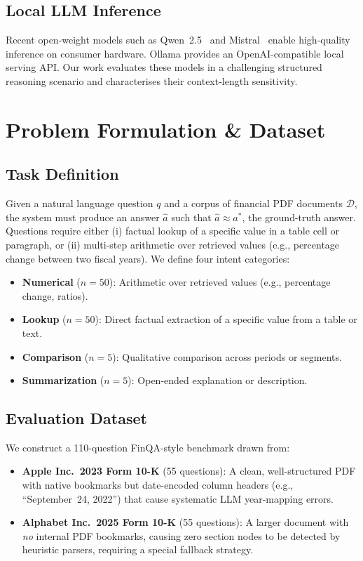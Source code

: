 \documentclass[conference]{IEEEtran}
\begin{document}
\subsection{Local LLM Inference}
Recent open-weight models such as Qwen~2.5~\cite{qwen2025} and
Mistral~\cite{jiang2023mistral} enable high-quality inference on consumer hardware.
Ollama provides an OpenAI-compatible local serving API. Our work evaluates these
models in a challenging structured reasoning scenario and characterises their
context-length sensitivity.

\section{Problem Formulation \& Dataset}

\subsection{Task Definition}
Given a natural language question $q$ and a corpus of financial PDF documents
$\mathcal{D}$, the system must produce an answer $\hat{a}$ such that
$\hat{a} \approx a^*$, the ground-truth answer. Questions require either
(i) factual lookup of a specific value in a table cell or paragraph, or
(ii) multi-step arithmetic over retrieved values (e.g., percentage change
between two fiscal years). We define four intent categories:

\begin{itemize}
  \item \textbf{Numerical} ($n=50$): Arithmetic over retrieved values
        (e.g., percentage change, ratios).
  \item \textbf{Lookup} ($n=50$): Direct factual extraction of a specific
        value from a table or text.
  \item \textbf{Comparison} ($n=5$): Qualitative comparison across periods
        or segments.
  \item \textbf{Summarization} ($n=5$): Open-ended explanation or description.
\end{itemize}

\subsection{Evaluation Dataset}
We construct a 110-question FinQA-style benchmark drawn from:
\begin{itemize}
  \item \textbf{Apple Inc.\ 2023 Form 10-K} (55 questions): A clean,
        well-structured PDF with native bookmarks but date-encoded column
        headers (e.g., ``September~24, 2022'') that cause systematic LLM
        year-mapping errors.
  \item \textbf{Alphabet Inc.\ 2025 Form 10-K} (55 questions): A larger
        document with \emph{no} internal PDF bookmarks, causing zero section
        nodes to be detected by heuristic parsers, requiring a special fallback
        strategy.
\end{itemize}
\end{document}
